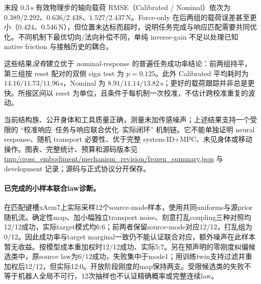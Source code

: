末段 $0.3\,\mathrm{s}$ 有效物理步的轴向载荷 RMSE（Calibrated / Nominal）依次为 $0.389/2.292$、$0.636/2.438$、$1.527/2.437\,\mathrm N$。Force-only 在后两组的载荷误差甚至更小（$0.424$、$0.546\,\mathrm N$），但位置未达标而超时，说明任务完成与响应匹配需要共同优化。不同机制下最优切向/法向补偿不同，单纯 inverse-gain 不足以处理已知 native friction 与接触历史的耦合。

这些结果\emph{没有}建立优于 nominal-response 的普遍任务成功率结论：前两组持平，第三组按 reset 配对的双侧 sign test 为 $p=0.125$。此外 Calibrated 平均耗时为 $14.16/11.73/11.96\,\mathrm s$，Nominal 为 $8.91/11.14/13.82\,\mathrm s$；更好的载荷跟踪并非总是更快。所报区间以 reset 为单位，且条件于每机制一次校准，不估计跨校准重复的波动。

当前结构族、公开身体和工具质量正确，测量未加传感噪声；上述结果支持一个受限的 ``校准响应--任务与响应联合优化--实际闭环'' 机制链。它不能单独证明 neural response、随机 transport 必要性、优于完整 system-ID+MPC、未见身体或移动操作。图表、完整统计、预算和源码版本见 \url{tmp/cross_embodiment/mechanism_revision/frozen_summary.json} 与 development 记录；源码与正式协议分开保存。


\paragraph{已完成的小样本联合law诊断。}
在匹配键槽xArm7上实际采样12个source-mode样本，使用共同uniforms与源prior随机流。确定性map、加小幅独立transport noise、刻意打乱coupling三种对照均12/12成功，实际target模式均6:6；前两者保留source-mode对应12/12，打乱组为0/12。因此成功率与target marginal一致仍不能认证联合对应，额外噪声在此样本暂无收益。按模型成本重加权时12/12成功、实际5:7。另在预声明的零刚度纠偏候选类中，原source law为6/12成功，失败集中于mode1；用训练twin支持过滤并重加权后12/12，但实际12:0。开放阶段刚度的map保持两支。受限候选类的失败不等于机器人全局不可行，12次抽样也不认证精确概率或完整连续law。

